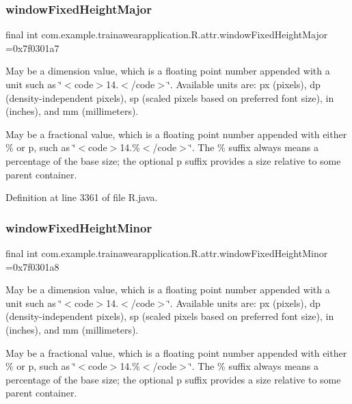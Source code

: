 \subsubsection{\texorpdfstring{windowFixedHeightMajor}{windowFixedHeightMajor}}
{\footnotesize\ttfamily final int com.\+example.\+trainawearapplication.\+R.\+attr.\+window\+Fixed\+Height\+Major =0x7f0301a7\hspace{0.3cm}{\ttfamily [static]}}

May be a dimension value, which is a floating point number appended with a unit such as \char`\"{}$<$code$>$14.\+5sp$<$/code$>$\char`\"{}. Available units are\+: px (pixels), dp (density-\/independent pixels), sp (scaled pixels based on preferred font size), in (inches), and mm (millimeters). 

May be a fractional value, which is a floating point number appended with either \% or p, such as \char`\"{}$<$code$>$14.\%$<$/code$>$\char`\"{}. The \% suffix always means a percentage of the base size; the optional p suffix provides a size relative to some parent container. 

Definition at line 3361 of file R.\+java.

\mbox{\label{classcom_1_1example_1_1trainawearapplication_1_1_r_1_1attr_aa01d13f7fad760b1651198d67c0fb0df}} 
\subsubsection{\texorpdfstring{windowFixedHeightMinor}{windowFixedHeightMinor}}
{\footnotesize\ttfamily final int com.\+example.\+trainawearapplication.\+R.\+attr.\+window\+Fixed\+Height\+Minor =0x7f0301a8\hspace{0.3cm}{\ttfamily [static]}}

May be a dimension value, which is a floating point number appended with a unit such as \char`\"{}$<$code$>$14.\+5sp$<$/code$>$\char`\"{}. Available units are\+: px (pixels), dp (density-\/independent pixels), sp (scaled pixels based on preferred font size), in (inches), and mm (millimeters). 

May be a fractional value, which is a floating point number appended with either \% or p, such as \char`\"{}$<$code$>$14.\%$<$/code$>$\char`\"{}. The \% suffix always means a percentage of the base size; the optional p suffix provides a size relative to some parent container. 

